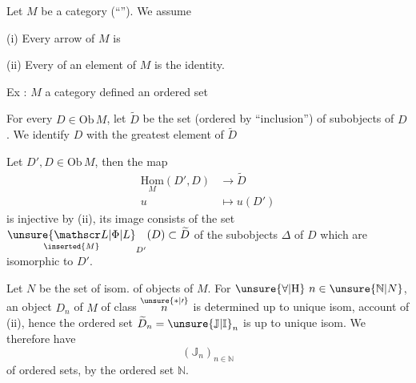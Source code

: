 
Let \(M\) be a category (``''). We assume

(i) Every arrow of \(M\) is 

(ii) Every  of an element of \(M\) is the identity.

Ex : \(M\) a category defined  an ordered set

For every \(D\in\mathrm{Ob}\,M\), let \(\widetilde D\) be the set (ordered by ``inclusion'') of subobjects of \(D\). We identify \(D\) with the greatest element of \(\widetilde D\)

Let \(D',D\in\mathrm{Ob}\,M\), then the map
\begingroup\makeatletter\tagsleft@true\makeatother
\[
\begin{aligned}
\underset{M}{\mathrm{Hom}}(D',D)&\longrightarrow\widetilde D\\
u&\longmapsto u(D')
\end{aligned}
\tag*{(\(\ast\))}
\]
\endgroup
is injective by (ii), its image consists of the set 
\(\underset{\inserted{M}}{\unsure{\mathscr L|\Phi|L}}_{D'}(D)\subset\widetilde D\)
of the subobjects \(\Delta\) of \(D\) which are isomorphic to \(D'\).


Let \(N\) be the  set of isom.  of objects of \(M\). 
For \(\unsure{\forall|\mathrm H}\ n\in\unsure{\mathbb N|N}\), an object \(D_n\) of \(M\) of class \(\overset{\unsure{\ast|\prime}}{n}\) is determined up to unique isom,  account of (ii), hence the ordered set \(\widetilde D_n=\unsure{\mathbb J|\mathbb I}_n\) is  up to unique isom. We therefore have  
\[
(\mathbb J_n)_{n\in\mathbb N}
\]
of ordered sets,  by the ordered set \(\mathbb N\).

